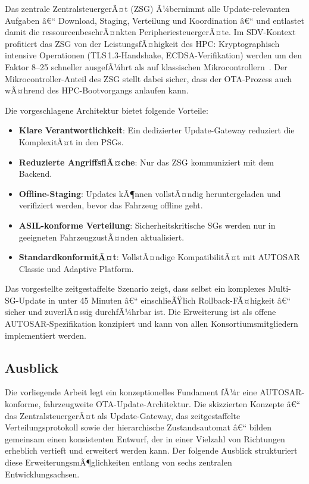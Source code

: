 ﻿\documentclass[12pt,a4paper,twoside]{article}
\begin{document}
Das zentrale ZentralsteuergerÃ¤t (ZSG) Ã¼bernimmt alle Update-relevanten
Aufgaben â€“ Download, Staging, Verteilung und Koordination â€“ und entlastet
damit die ressourcenbeschrÃ¤nkten PeripheriesteuergerÃ¤te. Im SDV-Kontext
profitiert das ZSG von der LeistungsfÃ¤higkeit des HPC: Kryptographisch
intensive Operationen (TLS\,1.3-Handshake, ECDSA-Verifikation) werden um den
Faktor 8--25 schneller ausgefÃ¼hrt als auf klassischen Mikrocontrollern~\cite{schneider2026ladekomm}.
Der Mikrocontroller-Anteil des ZSG stellt dabei sicher, dass der OTA-Prozess
auch wÃ¤hrend des HPC-Bootvorgangs anlaufen kann.

Die vorgeschlagene Architektur bietet folgende Vorteile:
\begin{itemize}
  \item \textbf{Klare Verantwortlichkeit}: Ein dedizierter Update-Gateway
    reduziert die KomplexitÃ¤t in den PSGs.
  \item \textbf{Reduzierte AngriffsflÃ¤che}: Nur das ZSG kommuniziert mit
    dem Backend.
  \item \textbf{Offline-Staging}: Updates kÃ¶nnen vollstÃ¤ndig heruntergeladen
    und verifiziert werden, bevor das Fahrzeug offline geht.
  \item \textbf{ASIL-konforme Verteilung}: Sicherheitskritische SGs werden
    nur in geeigneten FahrzeugzustÃ¤nden aktualisiert.
  \item \textbf{StandardkonformitÃ¤t}: VollstÃ¤ndige KompatibilitÃ¤t mit
    AUTOSAR Classic und Adaptive Platform.
\end{itemize}

Das vorgestellte zeitgestaffelte Szenario zeigt, dass selbst ein komplexes
Multi-SG-Update in unter 45 Minuten â€“ einschlieÃŸlich Rollback-FÃ¤higkeit â€“
sicher und zuverlÃ¤ssig durchfÃ¼hrbar ist. Die Erweiterung ist als offene
AUTOSAR-Spezifikation konzipiert und kann von allen Konsortiumsmitgliedern
implementiert werden.

\subsection{Ausblick}
\label{sec:ausblick}

Die vorliegende Arbeit legt ein konzeptionelles Fundament fÃ¼r eine
AUTOSAR-konforme, fahrzeugweite OTA-Update-Architektur. Die skizzierten
Konzepte â€“ das ZentralsteuergerÃ¤t als Update-Gateway, das zeitgestaffelte
Verteilungsprotokoll sowie der hierarchische Zustandsautomat â€“ bilden
gemeinsam einen konsistenten Entwurf, der in einer Vielzahl von Richtungen
erheblich vertieft und erweitert werden kann. Der folgende Ausblick
strukturiert diese ErweiterungsmÃ¶glichkeiten entlang von sechs zentralen
Entwicklungsachsen.
\end{document}
